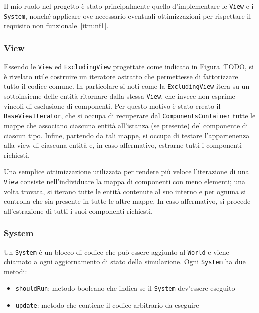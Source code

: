 Il mio ruolo nel progetto è stato principalmente quello d'implementare le \texttt{View} e i \texttt{System}, nonché
applicare ove necessario eventuali ottimizzazioni per rispettare il requisito non funzionale~\ref{itm:nf1}.

\subsubsection{View}

Essendo le \texttt{View} ed \texttt{ExcludingView} progettate come indicato in Figura~TODO, si è rivelato utile
costruire un iteratore astratto che permettesse di fattorizzare tutto il codice comune.
In particolare si noti come la \texttt{ExcludingView} itera su un sottoinsieme delle entità ritornare dalla stessa
\texttt{View}, che invece non esprime vincoli di esclusione di componenti.
Per questo motivo è stato creato il \texttt{BaseViewIterator}, che si occupa di recuperare dal
\texttt{ComponentsContainer} tutte le mappe che associano ciascuna entità all'istanza (se presente) del componente di
ciascun tipo.
Infine, partendo da tali mappe, si occupa di testare l'appartenenza alla view di ciascuna entità e, in caso affermativo,
estrarne tutti i componenti richiesti.

Una semplice ottimizzazione utilizzata per rendere più veloce l'iterazione di una \texttt{View} consiste
nell'individuare la mappa di componenti con meno elementi;
una volta trovata, si iterano tutte le entità contenute al suo interno e per ognuna si controlla che sia presente in
tutte le altre mappe.
In caso affermativo, si procede all'estrazione di tutti i suoi componenti richiesti.

\subsubsection{System}

Un \texttt{System} è un blocco di codice che può essere aggiunto al \texttt{World} e viene chiamato a ogni aggiornamento
di stato della simulazione.
Ogni \texttt{System} ha due metodi:
\begin{itemize}
    \item \texttt{shouldRun}: metodo booleano che indica se il \texttt{System} dev'essere eseguito
    \item \texttt{update}: metodo che contiene il codice arbitrario da eseguire
\end{itemize}

